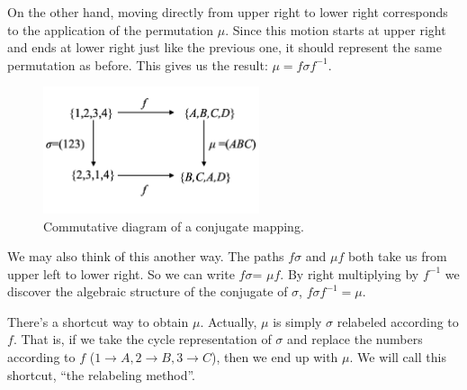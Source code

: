 On the other hand, moving directly from upper right to lower right corresponds to the application of 
the permutation $\mu$. Since this motion starts at upper right and ends at lower right just like the previous
one, it should represent the same permutation as before. This gives us the result:
 $\mu=f\sigma f^{-1}$.    

\begin{figure}[ht]
\begin{center}
\includegraphics[width=2.5in]{images/Commutative1.png}
\caption{Commutative diagram of a conjugate mapping.}\label{fig:Commutative1}
\end{center}
\end{figure}

We may also think of this another way. The paths $f\sigma$ and $\mu f$  both take us from upper left to lower right. 
 So we can write $f\sigma$= $\mu f$. By right multiplying by $f^{-1}$ we discover the algebraic structure of the conjugate of $\sigma$,  $f\sigma f^{-1}=\mu$. 
 
There's a shortcut way to obtain $\mu$. Actually, $\mu$ is simply $\sigma$ relabeled according to $f$.  That is, if we take the cycle representation of $\sigma$ and replace the numbers according to $f$ ($1\rightarrow A, 2\rightarrow B, 3\rightarrow C$), then we end up with $\mu$.  We will call this shortcut, ``the relabeling method''.

